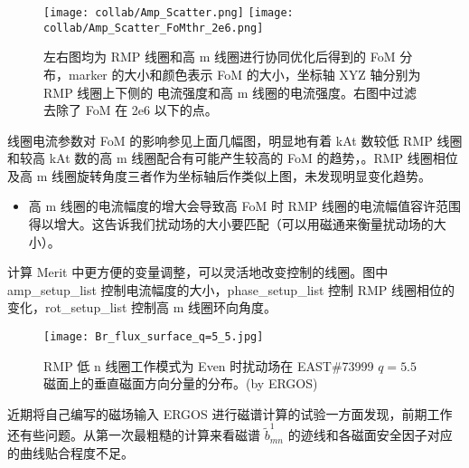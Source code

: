 \begin{figure}[htbp]
  \centering%
      \texttt{[image: collab/Amp\_Scatter.png]}
      \texttt{[image: collab/Amp\_Scatter\_FoMthr\_2e6.png]}
      \caption{左右图均为 RMP 线圈和高 m 线圈进行协同优化后得到的 FoM 分布，marker 的大小和颜色表示 FoM 的大小，坐标轴 XYZ 轴分别为 RMP 线圈上下侧的 电流强度和高 m 线圈的电流强度。右图中过滤去除了 FoM 在 2e6 以下的点。}
\end{figure}

  线圈电流参数对 FoM 的影响参见上面几幅图，明显地有着 kAt 数较低 RMP 线圈和较高 kAt 数的高 m 线圈配合有可能产生较高的 FoM 的趋势，。RMP 线圈相位及高 m 线圈旋转角度三者作为坐标轴后作类似上图，未发现明显变化趋势。
  \begin{itemize}
    \item 高 m 线圈的电流幅度的增大会导致高 FoM 时 RMP 线圈的电流幅值容许范围得以增大。这告诉我们扰动场的大小要匹配（可以用磁通来衡量扰动场的大小）。
  \end{itemize}




计算 Merit 中更方便的变量调整，可以灵活地改变控制的线圈。图中 amp\_setup\_list 控制电流幅度的大小，phase\_setup\_list 控制 RMP 线圈相位的变化，rot\_setup\_list 控制高 m 线圈环向角度。

  
  
  


\begin{figure}[htbp]
    \centering%
    \texttt{[image: Br\_flux\_surface\_q=5\_5.jpg]}
    \caption{RMP 低 n 线圈工作模式为 Even 时扰动场在 EAST\#73999 $q=5.5$ 磁面上的垂直磁面方向分量的分布。(by ERGOS\cite{nardon_edge_2007})}
\end{figure}




近期将自己编写的磁场输入 ERGOS 进行磁谱计算的试验一方面发现，前期工作还有些问题。从第一次最粗糙的计算来看磁谱 $\tilde{b}^1_{mn}$ 的迹线和各磁面安全因子对应的曲线贴合程度不足。


\begin{figure}[t]
    \centering
    \hfill
\end{figure}




